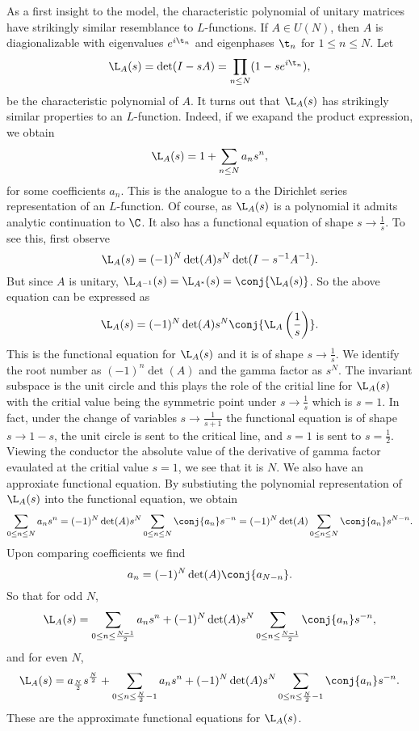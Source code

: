       As a first insight to the model, the characteristic polynomial of unitary matrices have strikingly similar resemblance to $L$-functions. If $A \in U(N)$, then $A$ is diagionalizable with eigenvalues $e^{i\t_{n}}$ and eigenphases $\t_{n}$ for $1 \le n \le N$. Let
      \[
        \L_{A}(s) = \det(I-sA) = \prod_{n \le N}(1-se^{i\t_{n}}),
      \]
      be the characteristic polynomial of $A$. It turns out that $\L_{A}(s)$ has strikingly similar properties to an $L$-function. Indeed, if we exapand the product expression, we obtain
      \[
        \L_{A}(s) = 1+\sum_{n \le N}a_{n}s^{n},
      \]
      for some coefficients $a_{n}$. This is the analogue to a the Dirichlet series representation of an $L$-function. Of course, as $\L_{A}(s)$ is a polynomial it admits analytic continuation to $\C$. It also has a functional equation of shape $s \to \frac{1}{s}$. To see this, first observe
      \[
        \L_{A}(s) = (-1)^{N}\det(A)s^{N}\det(I-s^{-1}A^{-1}).
      \]
      But since $A$ is unitary, $\L_{A^{-1}}(s) = \L_{A^{\ast}}(s) = \conj{\L_{A}(s)}$. So the above equation can be expressed as
      \[
        \L_{A}(s) = (-1)^{N}\det(A)s^{N}\conj{\L_{A}\left(\frac{1}{s}\right)}.
      \]
      This is the functional equation for $\L_{A}(s)$ and it is of shape $s \to \frac{1}{s}$. We identify the root number as $(-1)^{n}\det(A)$ and the gamma factor as $s^{N}$. The invariant subspace is the unit circle and this plays the role of the critial line for $\L_{A}(s)$ with the critial value being the symmetric point under $s \to \frac{1}{s}$ which is $s = 1$. In fact, under the change of variables $s \to \frac{1}{s+1}$ the functional equation is of shape $s \to 1-s$, the unit circle is sent to the critical line, and $s = 1$ is sent to $s = \frac{1}{2}$. Viewing the conductor the absolute value of the derivative of gamma factor evaulated at the critial value $s = 1$, we see that it is $N$. We also have an approxiate functional equation. By substiuting the polynomial representation of $\L_{A}(s)$ into the functional equation, we obtain
      \[
        \sum_{0 \le n \le N}a_{n}s^{n} = (-1)^{N}\det(A)s^{N}\sum_{0 \le n \le N}\conj{a_{n}}s^{-n} = (-1)^{N}\det(A)\sum_{0 \le n \le N}\conj{a_{n}}s^{N-n}.
      \]
      Upon comparing coefficients we find
      \[
        a_{n} = (-1)^{N}\det(A)\conj{a_{N-n}}.
      \]
      So that for odd $N$,
      \[
        \L_{A}(s) = \sum_{0 \le n \le \frac{N-1}{2}}a_{n}s^{n}+(-1)^{N}\det(A)s^{N}\sum_{0 \le n \le \frac{N-1}{2}}\conj{a_{n}}s^{-n},
      \]
      and for even $N$,
      \[
        \L_{A}(s) = a_{\frac{N}{2}}s^{\frac{N}{2}}+\sum_{0 \le n \le \frac{N}{2}-1}a_{n}s^{n}+(-1)^{N}\det(A)s^{N}\sum_{0 \le n \le \frac{N}{2}-1}\conj{a_{n}}s^{-n}.
      \]
      These are the approximate functional equations for $\L_{A}(s)$.

